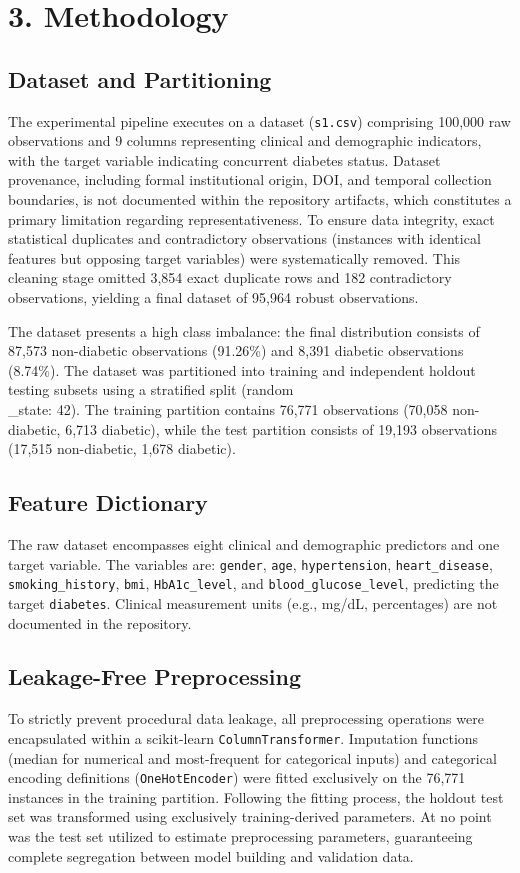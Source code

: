 \documentclass[conference]{IEEEtran}
\begin{document}
\section{3. Methodology}


\subsection{Dataset and Partitioning}
The experimental pipeline executes on a dataset (\texttt{s1.csv}) comprising 100,000 raw observations and 9 columns representing clinical and demographic indicators, with the target variable indicating concurrent diabetes status. Dataset provenance, including formal institutional origin, DOI, and temporal collection boundaries, is not documented within the repository artifacts, which constitutes a primary limitation regarding representativeness. To ensure data integrity, exact statistical duplicates and contradictory observations (instances with identical features but opposing target variables) were systematically removed. This cleaning stage omitted 3,854 exact duplicate rows and 182 contradictory observations, yielding a final dataset of 95,964 robust observations.

The dataset presents a high class imbalance: the final distribution consists of 87,573 non-diabetic observations (91.26\%) and 8,391 diabetic observations (8.74\%). The dataset was partitioned into training and independent holdout testing subsets using a stratified split (random\\_state: 42). The training partition contains 76,771 observations (70,058 non-diabetic, 6,713 diabetic), while the test partition consists of 19,193 observations (17,515 non-diabetic, 1,678 diabetic).


\subsection{Feature Dictionary}
The raw dataset encompasses eight clinical and demographic predictors and one target variable. The variables are: \texttt{gender}, \texttt{age}, \texttt{hypertension}, \texttt{heart\_disease}, \texttt{smoking\_history}, \texttt{bmi}, \texttt{HbA1c\_level}, and \texttt{blood\_glucose\_level}, predicting the target \texttt{diabetes}. Clinical measurement units (e.g., mg/dL, percentages) are not documented in the repository.


\subsection{Leakage-Free Preprocessing}
To strictly prevent procedural data leakage, all preprocessing operations were encapsulated within a scikit-learn \texttt{ColumnTransformer}. Imputation functions (median for numerical and most-frequent for categorical inputs) and categorical encoding definitions (\texttt{OneHotEncoder}) were fitted exclusively on the 76,771 instances in the training partition. Following the fitting process, the holdout test set was transformed using exclusively training-derived parameters. At no point was the test set utilized to estimate preprocessing parameters, guaranteeing complete segregation between model building and validation data.
\end{document}
